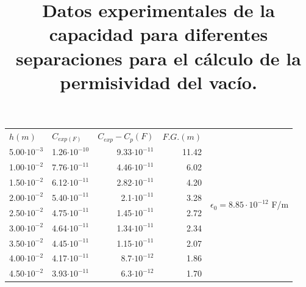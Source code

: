 \documentclass[a4paper,12pt]{article}
\begin{document}
\begin{table}[h!]
    \centering
    \title{\textbf{Datos experimentales de la capacidad para diferentes separaciones para el cálculo de la permisividad del vacío.}}
    \begin{tabular}{|r|r|r|r|l|} 
    \hline
    \multicolumn{1}{|l|}{$h(m)$} & \multicolumn{1}{l|}{$C_{exp(F)}$} & \multicolumn{1}{l|}{$C_{exp}-C_p(F)$} & \multicolumn{1}{l|}{$F.G.(m)$} & \multirow{15}{*}{$\epsilon_0 = 8.85\cdot 10^{-12}$ F/m}  \\ 
    \cline{1-4}
    5.00$\cdot 10^{-3}$                   & 1.26$\cdot 10^{-10}$                     & 9.33$\cdot 10^{-11}$                        & 11.42             &                                         \\ 
    \cline{1-4}
    1.00$\cdot 10^{-2}$                   & 7.76$\cdot 10^{-11}$                     & 4.46$\cdot 10^{-11}$                        & 6.02             &                                         \\ 
    \cline{1-4}
    1.50$\cdot 10^{-2}$                   & 6.12$\cdot 10^{-11}$                     & 2.82$\cdot 10^{-11}$                        & 4.20             &                                         \\ 
    \cline{1-4}
    2.00$\cdot 10^{-2}$                   & 5.40$\cdot 10^{-11}$                     & 2.1$\cdot 10^{-11}$                         & 3.28             &                                         \\ 
    \cline{1-4}
    2.50$\cdot 10^{-2}$                   & 4.75$\cdot 10^{-11}$                     & 1.45$\cdot 10^{-11}$                        & 2.72             &                                         \\ 
    \cline{1-4}
    3.00$\cdot 10^{-2}$                   & 4.64$\cdot 10^{-11}$                     & 1.34$\cdot 10^{-11}$                        & 2.34             &                                         \\ 
    \cline{1-4}
    3.50$\cdot 10^{-2}$                   & 4.45$\cdot 10^{-11}$                     & 1.15$\cdot 10^{-11}$                        & 2.07             &                                         \\ 
    \cline{1-4}
    4.00$\cdot 10^{-2}$                   & 4.17$\cdot 10^{-11}$                     & 8.7$\cdot 10^{-12}$                         & 1.86              &                                         \\ 
    \cline{1-4}
    4.50$\cdot 10^{-2}$                   & 3.93$\cdot 10^{-11}$                     & 6.3$\cdot 10^{-12}$                         & 1.70             &                                         \\ 

\end{tabular}
\end{table}
\end{document}
